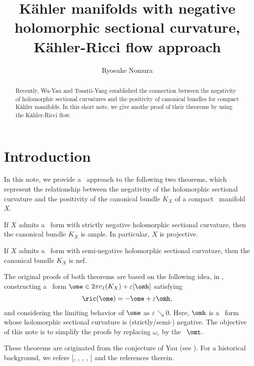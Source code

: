\documentclass[12pt]{amsart}
\title[Negative holomorphic sectional curvature and K\"ahler-Ricci flow]
{K\"ahler manifolds with negative holomorphic sectional curvature, K\"ahler-Ricci flow approach}
\author
{Ryosuke Nomura}
\begin{document}
\begin{abstract}
	Recently, Wu-Yau and Tosatti-Yang established the connection between  the negativity of  holomorphic sectional curvatures and the positivity of canonical bundles for  compact K\"ahler manifolds. In this short note, we give anothe proof of their theorems by using the K\"ahler-Ricci flow.
\end{abstract}

\maketitle

\section{Introduction}

In this note, we provide a \krf  \ approach to the following two theorems, which represent the relationship between the negativity of the holomorphic sectional curvature and the positivity of the canonical bundle $K_X$ of a compact \kahler \ manifold $X$.

\begin{theorem}\label{amplethm}
If $X$ admits a \kahler \ form with strictly negative holomorphic sectional curvature, then the canonical bundle $K_X$ is ample. In particular, $X$ is projective.
\end{theorem}


\begin{theorem}\label{nefthm}
If $X$ admits a \kahler \ form with semi-negative holomorphic sectional curvature, then the canonical bundle $K_X$ is nef.
\end{theorem}

The original proofs of both theorems are based on the following idea, in \citep{WuYau16}, constructing a \kahler \ form $\ome \in 2\pi c_1(K_X) + \varepsilon [\omh]$ satisfying  
\begin{align*}
\ric(\ome ) = - \ome + \varepsilon \omh,
\end{align*}
and considering the limiting behavior of $\ome $ as $\varepsilon \searrow 0$. Here, $\omh $ is a \kahler \ form whose holomorphic sectional curvature is (strictly/semi-) negative.
The objective of this note is to simplify the proofs by replacing $\omega_\varepsilon$ by the \krf \ $\omt$. 

These theorems are originated from the conjecture of Yau (see \citep[Conjecture 1.2]{2014arXiv1403.4210H}).
For a historical background, we refere [\citet{2014arXiv1403.4210H}, \citet{WuYau16}, \citet{WuYau16remark}, \citet{TosattiYang15}, \citet{2016arXiv160601381D}] and the references therein. 
\end{document}
